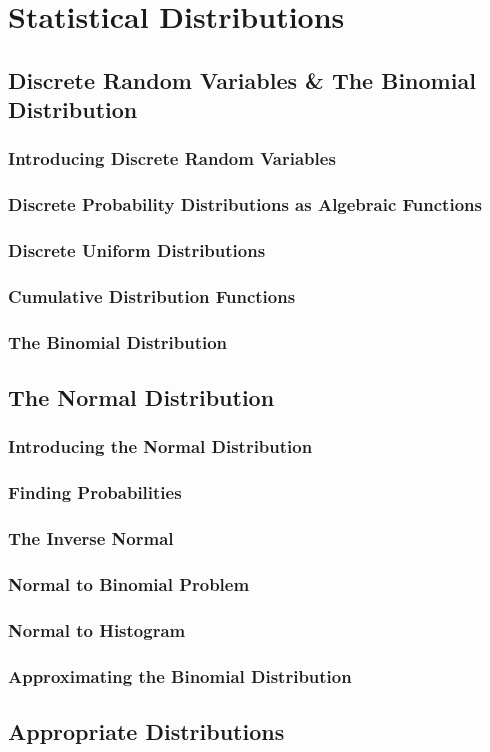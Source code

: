 \documentclass[../maths.tex]{subfiles}
\begin{document}
\chapter{Statistical Distributions}
\section{Discrete Random Variables \& The Binomial Distribution}
\subsection*{Introducing Discrete Random Variables}
\subsection*{Discrete Probability Distributions as Algebraic Functions}
\subsection*{Discrete Uniform Distributions}
\subsection*{Cumulative Distribution Functions}
\subsection*{The Binomial Distribution}
\section{The Normal Distribution}
\subsection*{Introducing the Normal Distribution}
\subsection*{Finding Probabilities}
\subsection*{The Inverse Normal}
\subsection*{Normal to Binomial Problem}
\subsection*{Normal to Histogram}
\subsection*{Approximating the Binomial Distribution}
\section{Appropriate Distributions}
\end{document}

